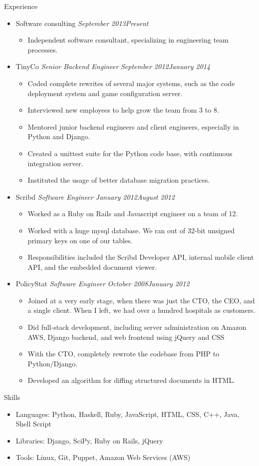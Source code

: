 \documentclass[11pt,oneside]{article}
\newenvironment{ressection}[1]{
    \textrm{\Large#1}
    \begin{itemize}
}{
    \end{itemize}
}
\newcommand{\resitem}[1]{
    \item \begin{flushleft} \textsf{#1} \end{flushleft}
}
\newcommand{\ressubitem}[1]{
    \item \begin{flushleft} \textsf{#1} \end{flushleft}
}
\newcommand{\resbigitem}[3]{
    \item
    \textrm{#1}
    \hspace{5pt}
    \textit{#2}
    \hfill
    \textit{#3}
}
\newenvironment{ressubsec}[3]{
    \resbigitem{#1}{#2}{#3}
    \begin{itemize}
}{
    \end{itemize}
}
\begin{document}
\begin{ressection}{Experience}

    \begin{ressubsec}{Software consulting}{}{September 2013\textendash Present}
        \ressubitem{Independent software consultant, specializing in engineering team processes.}
    \end{ressubsec}

    \begin{ressubsec}{TinyCo}{Senior Backend Engineer}{September 2012\textendash January 2014}
        \ressubitem{Coded complete rewrites of several major systems, such as the code deployment system and game configuration server.}
        \ressubitem{Interviewed new employees to help grow the team from 3 to 8.}
        \ressubitem{Mentored junior backend engineers and client engineers, especially in Python and Django.}
        \ressubitem{Created a unittest suite for the Python code base, with continuous integration server.}
        \ressubitem{Instituted the usage of better database migration practices.}
    \end{ressubsec}

    \begin{ressubsec}{Scribd}{Software Engineer}{January 2012\textendash August 2012}
        \ressubitem{Worked as a Ruby on Rails and Javascript engineer on a team of 12.}
        \ressubitem{Worked with a huge mysql database. We ran out of 32-bit unsigned primary keys on one of our tables.}
        \ressubitem{Responsibilities included the Scribd Developer API, internal mobile client API, and the embedded document viewer.}
    \end{ressubsec}

    \begin{ressubsec}{PolicyStat}{Software Engineer}{October 2008\textendash January 2012}
        \ressubitem{Joined at a very early stage, when there was just the CTO, the CEO, and a single client. When I left, we had over a hundred hospitals as customers.}
        \ressubitem{Did full-stack development, including server administration on Amazon AWS, Django backend, and web frontend using jQuery and CSS}
        \ressubitem{With the CTO, completely rewrote the codebase from PHP to Python/Django.}
        \ressubitem{Developed an algorithm for diffing structured documents in HTML.}
    \end{ressubsec}

\end{ressection}

\begin{ressection}{Skills}
    \resitem{
        \textrm{Languages:}
        Python,
        Haskell,
        Ruby,
        JavaScript,
        HTML,
        CSS,
        C++,
        Java,
        Shell Script
    }

    \resitem{
        \textrm{Libraries:}
        Django,
        SciPy,
        Ruby on Rails,
        jQuery
    }

    \resitem{
        \textrm{Tools:}
        Linux,
        Git,
        Puppet,
        Amazon Web Services (AWS)
    }
\end{ressection}
\end{document}
